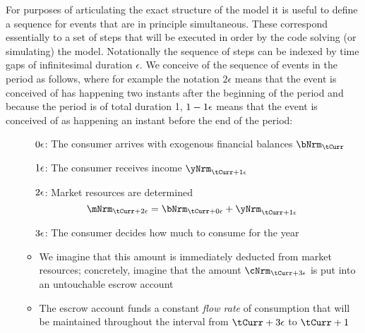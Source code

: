 \documentclass[./SolvingMicroDSOPs]{subfiles}
\begin{document}
For purposes of articulating the exact structure of the model it is useful to define a sequence for events that are in principle simultaneous.  These correspond essentially to a set of steps that will be executed in order by the code solving (or simulating) the model.  Notationally the sequence of steps can be indexed by time gaps of infinitesimal duration $\epsilon$.  We conceive of the sequence of events in the period as follows, where for example the notation $2\epsilon$ means that the event is conceived of has happening two instants after the beginning of the period and because the period is of total duration 1, $1-1\epsilon$ means that the event is conceived of as happening an instant before the end of the period:
\begin{enumerate}
\item[$\phantom{1-}0\epsilon$:] The consumer arrives with exogenous financial balances $\bNrm_{\tCurr}$

\item[$\phantom{1-}1\epsilon$:] The consumer receives income $\yNrm_{\tCurr+\receiveinc}$
\item[$\phantom{1-}2\epsilon$:] Market resources are determined
\begin{equation}
  \mNrm_{\tCurr+\calculatem} = \bNrm_{\tCurr+\beginWithb}+\yNrm_{\tCurr+\receiveinc}
\end{equation}

\item[$\phantom{1-}3\epsilon$:]  The consumer decides how much to consume for the year
  \begin{itemize}
    \item We imagine that this amount is immediately deducted from market resources; concretely, imagine that the amount $\cNrm_{\tCurr+\choosecons}$ is put into an untouchable escrow account
    \item The escrow account funds a constant \textit{flow rate} of consumption that will be maintained throughout the interval from $\tCurr+\choosecons$ to $\tCurr+1$


\end{itemize}
\end{enumerate}
\end{document}
